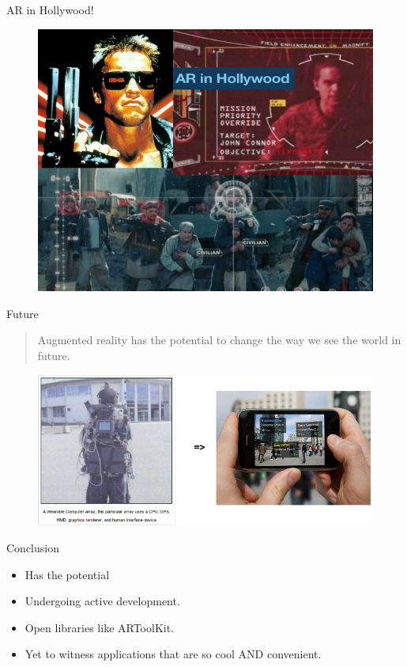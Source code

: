 \documentclass{beamer}
\begin{document}
\begin{frame}{AR in Hollywood!}
	\begin{figure}
		\includegraphics[scale=.45]{movie.png}
	\end{figure}
\end{frame}


\begin{frame}{Future}
	\begin{quote}
		Augmented reality has the potential to change the way we see the world in future.
	\end{quote}
	\begin{figure}
		\includegraphics[scale=.45]{conclusion.png}\\
	\end{figure}
\end{frame}


\begin{frame}{Conclusion}
	\begin{itemize}
		\item Has the potential
		\item Undergoing active development.
		\item Open libraries like ARToolKit.
		\item Yet to witness applications that are so cool AND convenient. 
 	\end{itemize}
\end{frame}
\end{document}

